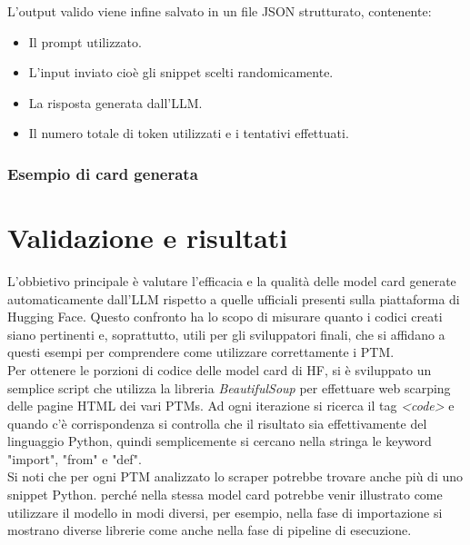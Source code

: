 \documentclass{article}
\begin{document}
\begin{itemize}
L’output valido viene infine salvato in un file JSON strutturato, contenente:  
\begin{itemize}
    \item Il prompt utilizzato.
    \item L'input inviato cioè gli snippet scelti randomicamente.
    \item La risposta generata dall’LLM.
    \item Il numero totale di token utilizzati e i tentativi effettuati.
\end{itemize}

\subsubsection{Esempio di card generata}


    
\end{itemize}

\section{Validazione e risultati}

L'obbietivo principale è valutare l'efficacia e la qualità delle model card generate automaticamente dall'LLM rispetto a quelle ufficiali presenti sulla piattaforma di Hugging Face.  Questo confronto ha lo scopo di misurare quanto i codici creati siano pertinenti e, soprattutto, utili per gli sviluppatori finali, che si affidano a questi esempi per comprendere come utilizzare correttamente i PTM.\\
Per ottenere le porzioni di codice delle model card di HF, si è sviluppato un semplice script che utilizza la libreria \textit{BeautifulSoup} per effettuare web scarping delle pagine HTML dei vari PTMs. Ad ogni iterazione si ricerca il tag \textit{\textless code\textgreater} e quando c'è corrispondenza si controlla che il risultato sia effettivamente del linguaggio Python, quindi semplicemente si cercano nella stringa le keyword "import", "from" e "def".\\
Si noti che per ogni PTM analizzato lo scraper potrebbe trovare anche più di uno snippet Python. perché nella stessa model card potrebbe venir illustrato come utilizzare il modello in modi diversi, per esempio, nella fase di importazione si mostrano diverse librerie come anche nella fase di pipeline di esecuzione.
\end{document}
